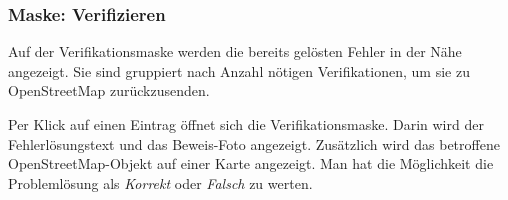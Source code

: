 \begin{figure}[H]
\hfill
{}
\end{figure}

\subsubsection{Maske: Verifizieren}
Auf der Verifikationsmaske werden die bereits gelösten Fehler in der Nähe angezeigt.
Sie sind gruppiert nach Anzahl nötigen Verifikationen, um sie zu OpenStreetMap zurückzusenden.

Per Klick auf einen Eintrag öffnet sich die Verifikationsmaske.
Darin wird der Fehlerlösungstext und das Beweis-Foto angezeigt.
Zusätzlich wird das betroffene OpenStreetMap-Objekt auf einer Karte angezeigt.
Man hat die Möglichkeit die Problemlösung als \emph{Korrekt} oder \emph{Falsch} zu werten.

